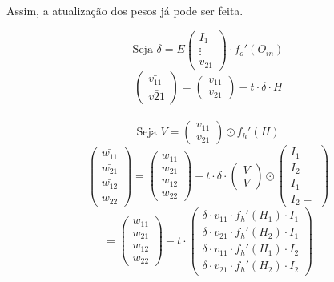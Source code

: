 \documentclass{article}
\begin{document}
Assim, a atualização dos pesos já pode ser feita. 


$$\text{Seja }\delta = E\begin{pmatrix}I_{1}\\ \vdots \\v_{21} \end{pmatrix}\cdot f_o'(O_{in})
$$
$$
\begin{pmatrix}
\bar{v_{11}} \\ \bar{v{21}}
\end{pmatrix}
=
\begin{pmatrix}
v_{11} \\ v_{21}
\end{pmatrix} 
-
t \cdot \delta \cdot H
$$
\\
$$\text{Seja } V = \begin{pmatrix}
v_{11}\\v_{21}
\end{pmatrix}\odot f_h'(H)$$
$$
\begin{pmatrix}
\bar{w_{11}} \\
\bar{w_{21}} \\
\bar{w_{12}} \\
\bar{w_{22}}
\end{pmatrix}
=
\begin{pmatrix}
w_{11} \\
w_{21} \\
w_{12} \\
w_{22}
\end{pmatrix}
- t \cdot \delta \cdot \begin{pmatrix}
V \\ V
\end{pmatrix} \odot \begin{pmatrix}
I_1\\I_2\\I_1\\I_2 =
\end{pmatrix}
$$
$$= \begin{pmatrix}
w_{11} \\
w_{21} \\
w_{12} \\
w_{22}
\end{pmatrix}
- t \cdot \begin{pmatrix}
\delta \cdot v_{11} \cdot f_h'(H_1) \cdot I_1\\
\delta \cdot v_{21} \cdot f_h'(H_2) \cdot I_1\\
\delta \cdot v_{11} \cdot f_h'(H_1) \cdot I_2\\
\delta \cdot v_{21} \cdot f_h'(H_2) \cdot I_2
\end{pmatrix}$$
\end{document}
